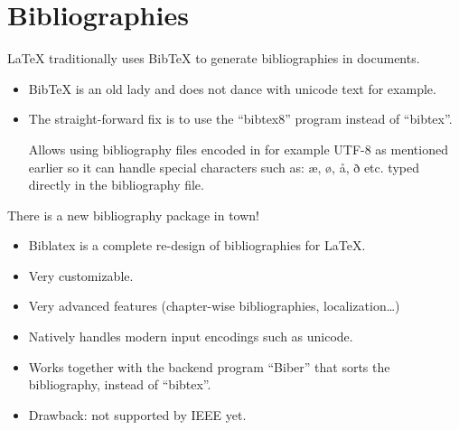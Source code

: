 \documentclass[english]{beamer}
\begin{document}


\section{Bibliographies}


\begin{frame}{\insertsection}
  \LaTeX{} traditionally uses BibTeX to generate bibliographies in
  documents.
  \begin{itemize}
  \item BibTeX is an old lady and does not dance with unicode text for example.
  \item The straight-forward fix is to use the ``bibtex8'' program
    instead of ``bibtex''.

    Allows using bibliography files encoded in for example UTF-8 as
    mentioned earlier so it can handle special characters such as: æ,
    ø, å, ð etc. typed directly in the bibliography file.
  \end{itemize}
\end{frame}

\begin{frame}{\insertsection}
  There is a new bibliography package in town!
  \begin{itemize}
  \item Biblatex is a complete re-design of bibliographies for \LaTeX.
  \item Very customizable.
  \item Very advanced features (chapter-wise bibliographies,
    localization\ldots)
  \item Natively handles modern input encodings such as unicode.
  \item Works together with the backend program ``Biber'' that sorts
    the bibliography, instead of ``bibtex''.
  \item Drawback: not supported by IEEE yet.
  \end{itemize}
\end{frame}

\end{document}
